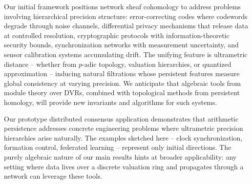 \documentclass[11pt]{amsart}
\theoremstyle{plain}
\theoremstyle{definition}
\begin{document}
Our initial framework positions network sheaf cohomology to address problems involving hierarchical precision structure: error-correcting codes where codewords degrade through noise channels, differential privacy mechanisms that release data at controlled resolution, cryptographic protocols with information-theoretic security bounds, synchronization networks with measurement uncertainty, and sensor calibration systems accumulating drift. The unifying feature is ultrametric distance -- whether from $p$-adic topology, valuation hierarchies, or quantized approximation -- inducing natural filtrations whose persistent features measure global consistency at varying precision. We anticipate that algebraic tools from module theory over DVRs, combined with topological methods from persistent homology, will provide new invariants and algorithms for such systems. 

Our prototype distributed consensus application demonstrates that arithmetic persistence addresses concrete engineering problems where ultrametric precision hierarchies arise naturally. The examples sketched here -- clock synchronization, formation control, federated learning -- represent only initial directions. The purely algebraic nature of our main results hints at broader applicability: any setting where data lives over a discrete valuation ring and propagates through a network can leverage these tools.


\end{document}
